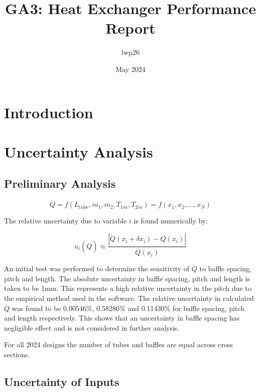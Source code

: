 \documentclass{article}
\begin{document}
\title{GA3: Heat Exchanger Performance Report}
\author{lwp26}
\date{May 2024}
\maketitle 

\section{Introduction}

\section{Uncertainty Analysis}

\subsection{Preliminary Analysis}

\begin{equation}
    \dot{Q} = f(L_\text{tube}, \dot{m}_1, \dot{m}_2, T_{1in}, T_{2in}) = f(x_1, x_2, \ldots, x_N)
\end{equation}

The relative uncertainty due to variable $i$ is found numerically by:

\begin{equation}
    u_i(\dot{Q}) \approx \frac{ \left| \dot{Q}(x_i + \delta x_i) - \dot{Q}(x_i) \right|}{\dot{Q}(x_i)}
\end{equation}

An initial test was performed to determine the sensitivity of $\dot{Q}$ to baffle spacing, pitch and length.
The absolute uncertainty in baffle spacing, pitch and length is taken to be 1mm.
This represents a high relative uncertainty in the pitch due to the empirical method used in the software.
The relative uncertainty in calculated $\dot{Q}$ was found to be 0.00546\%, 0.58286\% and 0.11430\% for baffle spacing, pitch and length respectively.
This shows that an uncertainty in baffle spacing has negligible effect and is not considered in further analysis.


For all 2024 designs the number of tubes and baffles are equal across cross sections.

\subsection{Uncertainty of Inputs}
\end{document}
